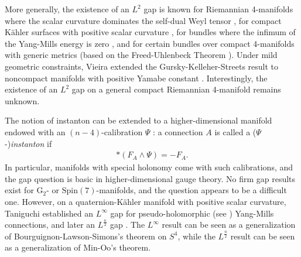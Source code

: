 \documentclass[12pt]{amsart}
\renewcommand{\1}{{\mathbf 1}}
\newcommand{\SU}{{\mathrm{SU} }}
\newcommand{\G}{{\mathrm G}}
\newcommand{\Spin}{{\mathrm{Spin} }}
\theoremstyle{others}
\numberwithin{equation}{section}
\begin{document}
More generally, the existence of an $L^2$ gap is known for Riemannian 4-manifolds where the scalar curvature dominates the self-dual Weyl tensor \cite{gerhardtgap, parker4Dgaugetheories},  %
for compact K\"ahler surfaces with positive scalar curvature \cite{huangkahlersurfaces}, for bundles where the infimum of the Yang-Mills energy is zero \cite{feehanflatgap}, and for certain bundles over compact 4-manifolds with generic metrics %
\cite{feehanfourgap} (based on the Freed-Uhlenbeck Theorem \cite[Theorem 3.17]{freeduhlenbeck}).
Under mild geometric constraints, Vieira extended the Gursky-Kelleher-Streets result to noncompact manifolds with positive Yamabe constant \cite{vieirapositiveyamabegap}. Interestingly, the existence of an $L^2$ gap on a general compact Riemannian 4-manifold remains unknown. %

The notion of instanton can be extended to a higher-dimensional manifold endowed with an $(n-4)$-calibration %
$\Psi$ \cite{corrigandevchand, tiancalibrated}: a connection \(A\) is called a (\(\Psi\)-)\emph{instanton} if
\begin{align*}
    \ast (F_A \wedge \Psi) = -F_A.
\end{align*}
In particular, manifolds with special holonomy %
come with such calibrations, %
and the gap question is basic in higher-dimensional gauge theory. 
No firm gap results exist for $\G_2$- or $\Spin(7)$-manifolds, and the question appears to be a difficult one. However, on a quaternion-K{\"a}hler manifold with positive scalar curvature, Taniguchi established an \(L^\infty\) gap \cite{qksupgap} for pseudo-holomorphic (see \cite[]{oliveirawaldron}) Yang-Mills connections, and later an \(L^{\frac{n}{2}}\) gap \cite{qkL2gap}. The \(L^\infty\) result can be seen as a generalization of Bourguignon-Lawson-Simons's %
theorem on \(S^4\), while the \(L^{\frac{n}{2}}\) result can be seen as a generalization of Min-Oo's theorem. \par 
\end{document}
